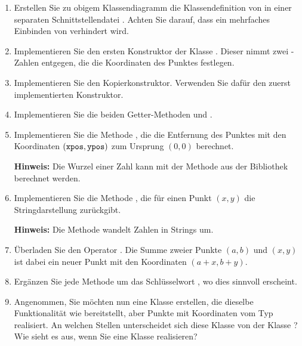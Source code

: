 \begin{enumerate}
	\item Erstellen Sie zu obigem Klassendiagramm die Klassendefinition von  in einer separaten Schnittstellendatei .
	Achten Sie darauf, dass ein mehrfaches Einbinden von  verhindert wird.
	\item Implementieren Sie den ersten Konstruktor der Klasse . Dieser nimmt zwei -Zahlen entgegen, die die Koordinaten des Punktes festlegen.
	\item Implementieren Sie den Kopierkonstruktor. Verwenden Sie dafür den zuerst implementierten Konstruktor.
	\item Implementieren Sie die beiden Getter-Methoden  und .
	\item Implementieren Sie die Methode , die die Entfernung des Punktes mit den Koordinaten $(\texttt{xpos}, \texttt{ypos})$ zum Ursprung $(0,0)$ berechnet.
	
	\textbf{Hinweis:} Die Wurzel einer Zahl kann mit der Methode  aus der Bibliothek  berechnet werden.
	\item Implementieren Sie die Methode , die für einen Punkt $(x,y)$ die Stringdarstellung  zurückgibt.
	
	\textbf{Hinweis:} Die Methode  wandelt Zahlen in Strings um.
	\item Überladen Sie den Operator \code{+}. Die Summe zweier Punkte $(a,b)$ und $(x,y)$ ist dabei ein neuer Punkt mit den Koordinaten $(a+x,b+y)$.
	\item Ergänzen Sie jede Methode um das Schlüsselwort , wo dies sinnvoll erscheint.
	\item Angenommen, Sie möchten nun eine Klasse  erstellen, die dieselbe Funktionalität wie  bereitstellt, aber Punkte mit Koordinaten vom Typ  realisiert.
	An welchen Stellen unterscheidet sich diese Klasse von der Klasse ? Wie sieht es aus, wenn Sie eine Klasse  realisieren?
\end{enumerate}
